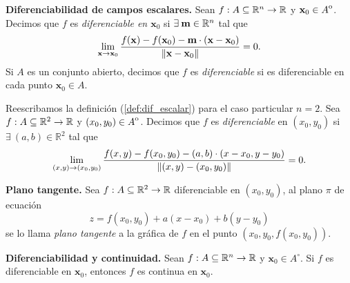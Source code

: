 \begin{definition}\textbf{Diferenciabilidad de campos escalares.} \label{def:dif_escalar}
\mbox{}
Sean $f: A  \subseteq  \mathbb{R}^n \to \mathbb{R}$ y $\mathbf{x}_0 \in {\kern0ptA}^{\mathrm{o}}$. Decimos que $f$ es \emph{diferenciable en $\mathbf{x}_0$} si $\exists\:\mathbf{m} \in \mathbb{R}^n$ tal que
\[
  \lim_{\mathbf{x} \to \mathbf{x}_0} \frac{f(\mathbf{x}) - f(\mathbf{x}_0) - \mathbf{m} \cdot (\mathbf{x} - \mathbf{x}_0)}{\norm{\mathbf{x} - \mathbf{x}_0}} = 0.
\]
Si $A$ es un conjunto abierto, decimos que $f$ es \emph{diferenciable} si es diferenciable en cada punto $\mathbf{x}_0 \in A$.
\end{definition}



\begin{obs} \label{def:dif_escalar_n2}  Reescribamos  la definici\'on  (\ref{def:dif_escalar}) para el caso particular $n=2$.   Sea $f: A  \subseteq  \mathbb{R}^{2} \to \mathbb{R}$ y $(x_0,y_0) \in {\kern0ptA}^{\mathrm{o}}$.  Decimos que $f$ es \emph{diferenciable} en $(x_0,y_0)$  si $\exists\: (a,b)  \in \mathbb{R}^{2}$ tal que
\[
  \lim_{ (x,y) \to   (x_0, y_0)}   \frac{ f(x,y ) - f( x_0,y_0 ) - (a,b)  \cdot (x-x_0, y-y_0)}{\norm{ (x,y)-(x_0,y_0) } }   = 0.
\]
\end{obs}

\begin{definition} \textbf{Plano tangente.}\label{def:plano_tangente} Sea $f: A  \subseteq  \mathbb{R}^{2} \to \mathbb{R}$ diferenciable en $(x_0,y_0)$,  al plano $\pi$  de ecuaci\'on $$z =  f( x_0,y_0 ) + a(x-x_0) + b(y-y_0)$$  se lo llama \emph{plano tangente} a la gr\'afica de $f$ en el punto $(x_0, y_0, f(x_0, y_0)).$
\end{definition}



\begin{theorem}\textbf{Diferenciabilidad y continuidad.} \label{teo:difCont} Sean $f: A  \subseteq  \mathbb{R}^n \to \mathbb{R}$ y $\mathbf{x}_0 \in  A^{\circ}$. Si $f$ es diferenciable en $\mathbf{x}_0$, entonces $f$ es continua en $\mathbf{x}_0$.
\end{theorem}

